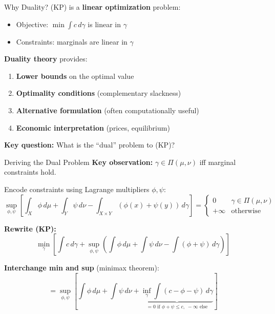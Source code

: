 \documentclass[aspectratio=169]{beamer}
\begin{document}
\begin{frame}{Why Duality?}
(KP) is a \textbf{linear optimization} problem:
\begin{itemize}
    \item Objective: $\min \int c \, d\gamma$ is linear in $\gamma$
    \item Constraints: marginals are linear in $\gamma$
\end{itemize}

\vspace{0.4cm}
\textbf{Duality theory} provides:
\begin{enumerate}
    \item \textbf{Lower bounds} on the optimal value
    \item \textbf{Optimality conditions} (complementary slackness)
    \item \textbf{Alternative formulation} (often computationally useful)
    \item \textbf{Economic interpretation} (prices, equilibrium)
\end{enumerate}

\vspace{0.4cm}
\textbf{Key question:} What is the ``dual'' problem to (KP)?
\end{frame}

\begin{frame}{Deriving the Dual Problem}
\textbf{Key observation:} $\gamma \in \Pi(\mu, \nu)$ iff marginal constraints hold.

Encode constraints using Lagrange multipliers $\phi, \psi$:
\[
\sup_{\phi, \psi} \left[ \int_X \phi \, d\mu + \int_Y \psi \, d\nu - \int_{X \times Y} (\phi(x) + \psi(y)) \, d\gamma \right]
= \begin{cases} 0 & \gamma \in \Pi(\mu,\nu) \\ +\infty & \text{otherwise} \end{cases}
\]

\vspace{0.3cm}
\textbf{Rewrite (KP):}
\[
\min_\gamma \left[ \int c \, d\gamma + \sup_{\phi,\psi} \left( \int \phi \, d\mu + \int \psi \, d\nu - \int (\phi + \psi) \, d\gamma \right) \right]
\]

\vspace{0.3cm}
\textbf{Interchange min and sup} (minimax theorem):
\[
= \sup_{\phi,\psi} \left[ \int \phi \, d\mu + \int \psi \, d\nu + \underbrace{\inf_\gamma \int (c - \phi - \psi) \, d\gamma}_{=0 \text{ if } \phi+\psi \leq c, \; -\infty \text{ else}} \right]
\]
\end{frame}
\end{document}
